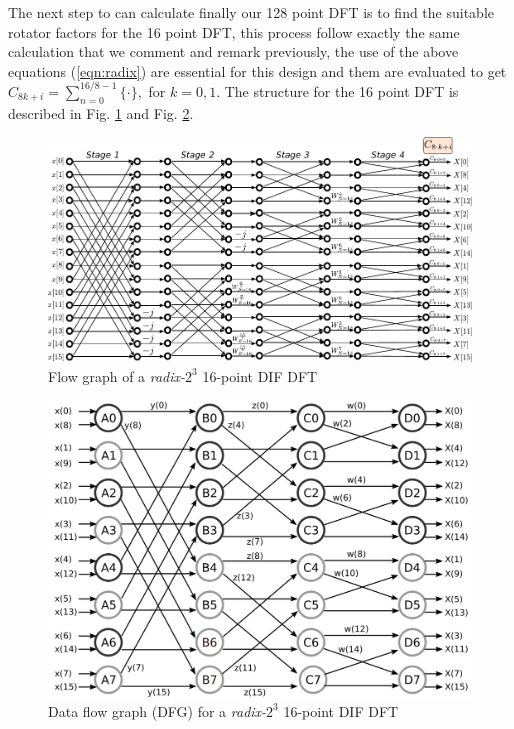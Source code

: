 \documentclass[journal,comsoc]{IEEEtran}
\begin{document}
The next step to can calculate finally our 128 point DFT is to find the suitable rotator factors for the 16 point DFT, this process follow exactly the same calculation that we comment and remark previously, the use of the above equations (\ref{eqn:radix}) are essential for this design and them are evaluated to get $C_{8k+i} = \sum_{n=0}^{16/8-1} \{ \cdot \}, $ for $k=0,1$. The structure for the 16 point DFT is described in Fig. \ref{fig:16puntosradix8conexion} and Fig. \ref{fig:16puntosradix8burbujas}. 
\begin{figure}[h!]
	\centering
	\includegraphics[width=\linewidth]{Diagramas/miSeccionFiguras/16PuntosRadix8Conexion.pdf}
	\caption{Flow graph of a \textit{radix-}$2^3$ 16-point DIF DFT}
	\label{fig:16puntosradix8conexion}
\end{figure}
\begin{figure}[h!]
	\centering
	\includegraphics[width=\linewidth]{Diagramas/16points_dfg.png}
	\caption{Data flow graph (DFG) for a \textit{radix-}$2^3$ 16-point DIF DFT}
	\label{fig:16puntosradix8burbujas}
\end{figure}
\end{document}
